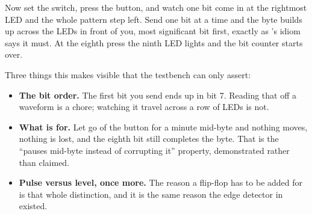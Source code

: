 Now set the switch, press the button, and watch one bit come in at the rightmost LED and the whole
pattern step left. Send  one bit at a time and the byte builds up across the LEDs in
front of you, most significant bit first, exactly as 's idiom says it must. At
the eighth press the ninth LED lights and the bit counter starts over.

Three things this makes visible that the testbench can only assert:
\begin{itemize}
  \item \textbf{The bit order.} The first bit you send ends up in bit 7. Reading that off a waveform
    is a chore; watching it travel across a row of LEDs is not.
  \item \textbf{What  is for.} Let go of the button for a minute mid-byte and
    nothing moves, nothing is lost, and the eighth bit still completes the byte. That is the
    ``pauses mid-byte instead of corrupting it'' property, demonstrated rather than claimed.
  \item \textbf{Pulse versus level, once more.} The reason a flip-flop has to be added for
     is that whole distinction, and it is the same reason the edge detector in
     existed.
\end{itemize}
